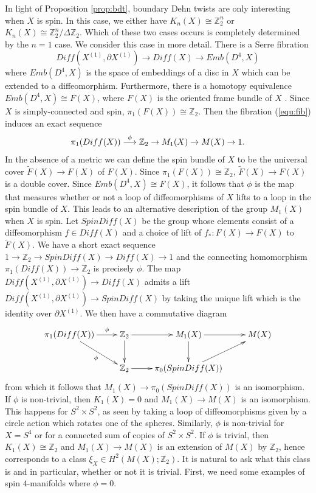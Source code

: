 \documentclass{amsart}
\theoremstyle{definition}
\theoremstyle{remark}
\numberwithin{equation}{section}
\begin{document}
In light of Proposition \ref{prop:bdt}, boundary Dehn twists are only interesting when $X$ is spin. In this case, we either have $K_n(X) \cong \mathbb{Z}_2^n$ or $K_n(X) \cong \mathbb{Z}_2^n/\Delta \mathbb{Z}_2$. Which of these two cases occurs is completely determined by the $n=1$ case. We consider this case in more detail. There is a Serre fibration 
\begin{equation}\label{equ:fib}
Diff( X^{(1)} , \partial X^{(1)} ) \to Diff(X) \to Emb\left( D^4 , X \right)
\end{equation}
where $Emb\left( D^4 , X \right)$ is the space of embeddings of a disc in $X$ which can be extended to a diffeomorphism. Furthermore, there is a homotopy equivalence $Emb\left( D^4 , X \right) \cong F(X)$, where $F(X)$ is the oriented frame bundle of $X$ \cite{gir}. Since $X$ is simply-connected and spin, $\pi_1(F(X)) \cong \mathbb{Z}_2$. Then the fibration (\ref{equ:fib}) induces an exact sequence
\[
\pi_1(Diff(X)) \buildrel \phi \over \longrightarrow \mathbb{Z}_2 \to M_1(X) \to M(X) \to 1.
\]
In the absence of a metric we can define the spin bundle of $X$ to be the universal cover $\widetilde{F}(X) \to F(X)$ of $F(X)$. Since $\pi_1(F(X)) \cong \mathbb{Z}_2$, $\widetilde{F}(X) \to F(X)$ is a double cover. Since $Emb\left( D^4 , X \right) \cong F(X)$, it follows that $\phi$ is the map that measures whether or not a loop of diffeomorphisms of $X$ lifts to a loop in the spin bundle of $X$. This leads to an alternative description of the group $M_1(X)$ when $X$ is spin. Let $SpinDiff(X)$ be the group whose elements consist of a diffeomorphism $f \in Diff(X)$ and a choice of lift of $f_* : F(X) \to F(X)$ to $\widetilde{F}(X)$. We have a short exact sequence $1 \to \mathbb{Z}_2 \to SpinDiff(X) \to Diff(X) \to 1$ and the connecting homomorphism $\pi_1(Diff(X)) \to \mathbb{Z}_2$ is precisely $\phi$. The map $Diff(X^{(1)} , \partial X^{(1)}) \to Diff(X)$ admits a lift $Diff(X^{(1)} , \partial X^{(1)} ) \to SpinDiff(X)$ by taking the unique lift which is the identity over $\partial X^{(1)}$. We then have a commutative diagram
\[
\xymatrix{
\pi_1(Diff(X)) \ar[r]^-{\phi} \ar[dr]_-{\phi} & \mathbb{Z}_2 \ar[r] \ar[d] & M_1(X) \ar[r] \ar[d] & M(X) \\
& \mathbb{Z}_2 \ar[r] & \pi_0(SpinDiff(X)) \ar[ur] & 
}
\]
from which it follows that $M_1(X) \to \pi_0( SpinDiff(X) )$ is an isomorphism. If $\phi$ is non-trivial, then $K_1(X) = 0$ and $M_1(X) \to M(X)$ is an isomorphism. This happens for $S^2 \times S^2$, as seen by taking a loop of diffeomorphisms given by a circle action which rotates one of the spheres. Similarly, $\phi$ is non-trivial for $X = S^4$ or for a connected sum of copies of $S^2 \times S^2$. If $\phi$ is trivial, then $K_1(X) \cong \mathbb{Z}_2$ and $M_1(X) \to M(X)$ is an extension of $M(X)$ by $\mathbb{Z}_2$, hence corresponds to a class $\xi_X \in H^2( M(X) ; \mathbb{Z}_2)$. It is natural to ask what this class is and in particular, whether or not it is trivial. First, we need some examples of spin $4$-manifolds where $\phi = 0$.
\end{document}

